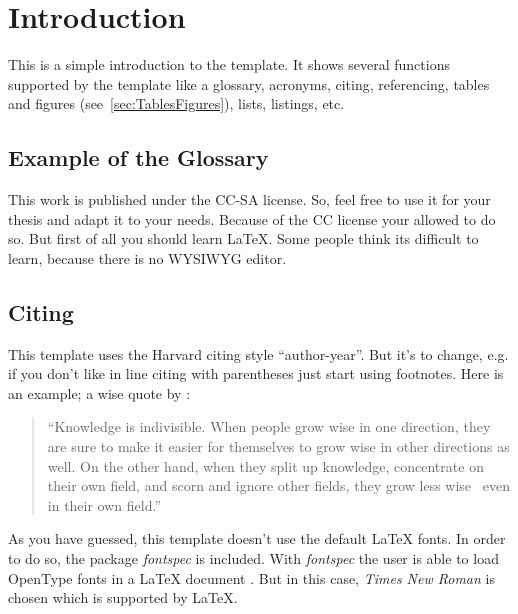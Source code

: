 



\chapter{Introduction}
\label{cha:Introduction}

This is a simple introduction to the template. It shows several functions supported by the template like a glossary, acronyms, citing, referencing, tables and figures (see~\cref{sec:TablesFigures}), lists, listings, etc.

\section{Example of the Glossary}
\label{sec:ExGlossary}

This work is published under the \gls{CC-SA} license. So, feel free to use it for your thesis and adapt it to your needs. Because of the \ac{CC} license your allowed to do so. But first of all you should learn {\LaTeX}. Some people think its difficult to learn, because there is no \ac{WYSIWYG} editor.


\section{Citing}
\label{sec:Citing}

This template uses the Harvard citing style \enquote{author-year}. But it's to change, e.g. if you don't like in line citing with parentheses just start using footnotes. Here is an example; a wise quote by \textcite{Asimov1997}:

\begin{quote}
\enquote{Knowledge is indivisible. When people grow wise in one direction, they are sure to make it easier for themselves to grow wise in other directions as well. On the other hand, when they split up knowledge, concentrate on their own field, and scorn and ignore other fields, they grow less wise \textemdash\ even in their own field.}
\end{quote}

As you have guessed, this template doesn't use the default {\LaTeX} fonts. In order to do so, the package \emph{fontspec} is included. With \emph{fontspec} the user is able to load OpenType fonts in a {\LaTeX} document \autocite[see][3]{Robertson2013}. But in this case, \emph{Times New Roman} is chosen which is supported by {\LaTeX}.

